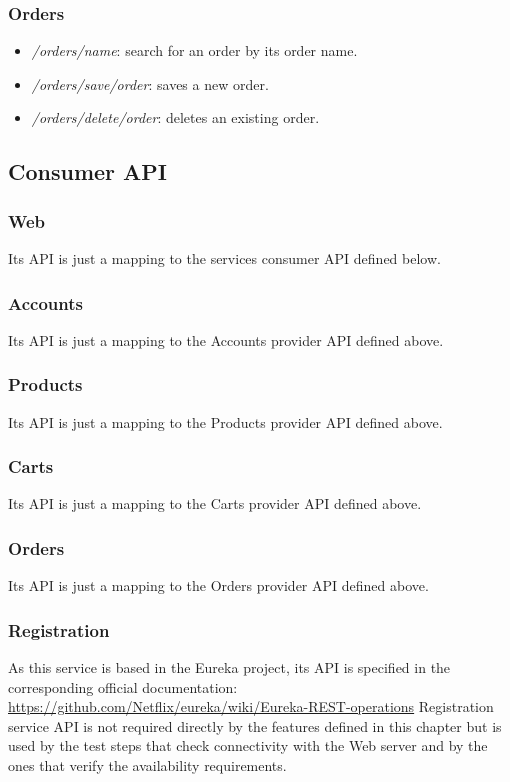 \subsubsection{Orders}
\begin{itemize}
	\item \textit{/orders/{name}}: search for an order by its order name.
	\item \textit{/orders/save/{order}}: saves a new order.
	\item \textit{/orders/delete/{order}}: deletes an existing order.
\end{itemize}


\subsection{Consumer API}

\subsubsection{Web}
Its API is just a mapping to the services consumer API defined below.

\subsubsection{Accounts}
Its API is just a mapping to the Accounts provider API defined above.

\subsubsection{Products}
Its API is just a mapping to the Products provider API defined above.

\subsubsection{Carts}
Its API is just a mapping to the Carts provider API defined above.

\subsubsection{Orders}
Its API is just a mapping to the Orders provider API defined above.

\subsubsection{Registration}
As this service is based in the Eureka project, its API is specified in the corresponding official documentation: 
\hyperref[]{\textcolor[rgb]{0,0,1}{https://github.com/Netflix/eureka/wiki/Eureka-REST-operations}}
Registration service API is not required directly by the features defined in this chapter but is used by the test steps that check connectivity with the Web server and by the ones that verify the availability requirements.


